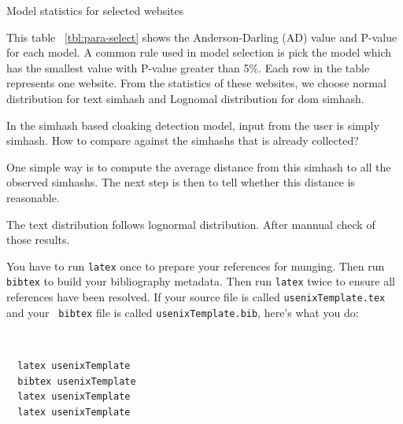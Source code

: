\begin{table}[!th]                                                     
  \centering                                                            
  \scriptsize                                                           
                                       
  \caption{Model statistics for selected websites}
  \label{tbl:para-select}                                         
\end{table}                                                            


This table ~\autoref{tbl:para-select} shows the Anderson-Darling (AD) value and P-value for each model.
A common rule used in model selection is pick the model which has the smallest
value with P-value greater than 5\%. Each row in the table represents one
website. From the statistics of these websites, we choose normal distribution
for text simhash and Lognomal distribution for dom simhash.

In the simhash based cloaking detection model, input from the user is simply simhash. How to compare against the simhashs that is already collected?

One simple way is to compute the average distance from this simhash to all the observed simhashs. The next step is then to tell whether this distance is reasonable. 

The text distribution follows lognormal distribution.
After mannual check of those results.




You have to run {\tt latex} once to prepare your references for
munging.  Then run {\tt bibtex} to build your bibliography metadata.
Then run {\tt latex} twice to ensure all references have been resolved.
If your source file is called {\tt usenixTemplate.tex} and your {\tt
bibtex} file is called {\tt usenixTemplate.bib}, here's what you do:
{\tt \small
  \begin{verbatim}
  latex usenixTemplate
  bibtex usenixTemplate
  latex usenixTemplate
  latex usenixTemplate
  \end{verbatim}
}


